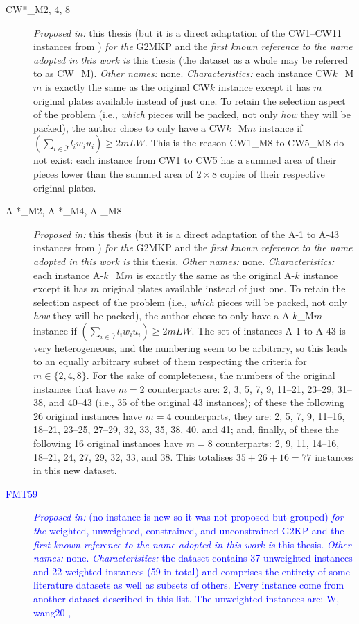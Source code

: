 \documentclass[ppgc,tese,english,formais,babel]{iiufrgs}
\newif\iffinalversion
\newcommand{\newtext}[1]{\iffinalversion%
#1%
\else%
\textcolor{blue}{#1}%
\fi%
}
\begin{document}
\begin{description}
\item [CW*\_M{2, 4, 8}] \emph{Proposed in:} this thesis (but it is a direct adaptation of the CW1--CW11 instances from \citet{fayard:1998}) \emph{for the} G2MKP and the \emph{first known reference to the name adopted in this work is} this thesis (the dataset as a whole may be referred to as CW\_M). \emph{Other names:} none. \emph{Characteristics:} each instance CW\(k\)\_M\(m\) is exactly the same as the original CW\(k\) instance except it has \(m\) original plates available instead of just one. To retain the selection aspect of the problem (i.e., \emph{which} pieces will be packed, not only \emph{how} they will be packed), the author chose to only have a CW\(k\)\_M\(m\) instance if \((\sum_{i \in \bar{J}} l_i w_i u_i) \geq 2 m L W\). This is the reason CW1\_M8 to CW5\_M8 do not exist: each instance from CW1 to CW5 has a summed area of their pieces lower than the summed area of \(2 \times 8\) copies of their respective original plates.
\item [A-*\_M2, A-*\_M4, A-\_M8] \emph{Proposed in:} this thesis (but it is a direct adaptation of the A-1 to A-43 instances from \citet{macedo:2010}) \emph{for the} G2MKP and the \emph{first known reference to the name adopted in this work is} this thesis. \emph{Other names:} none. \emph{Characteristics:} each instance A-\(k\)\_M\(m\) is exactly the same as the original A-\(k\) instance except it has \(m\) original plates available instead of just one. To retain the selection aspect of the problem (i.e., \emph{which} pieces will be packed, not only \emph{how} they will be packed), the author chose to only have a A-\(k\)\_M\(m\) instance if \((\sum_{i \in \bar{J}} l_i w_i u_i) \geq 2 m L W\). The set of instances A-1 to A-43 is very heterogeneous, and the numbering seem to be arbitrary, so this leads to an equally arbitrary subset of them respecting the criteria for \(m \in \{2, 4, 8\}\). For the sake of completeness, the numbers of the original instances that have \(m = 2\) counterparts are: 2, 3, 5, 7, 9, 11--21, 23--29, 31--38, and 40--43 (i.e., 35 of the original 43 instances); of these the following 26 original instances have \(m = 4\) counterparts, they are: 2, 5, 7, 9, 11--16, 18--21, 23--25, 27--29, 32, 33, 35, 38, 40, and 41; and, finally, of these the following 16 original instances have \(m = 8\) counterparts: 2, 9, 11, 14--16, 18--21, 24, 27, 29, 32, 33, and 38. This totalises \(35 + 26 + 16 = 77\) instances in this new dataset.
\item [\newtext{FMT59}] \newtext{\emph{Proposed in:} \citet{furini:2016} (no instance is new so it was not proposed but grouped) \emph{for the} weighted, unweighted, constrained, and unconstrained G2KP and the \emph{first known reference to the name adopted in this work is} this thesis. \emph{Other names:} none. \emph{Characteristics:} the dataset contains 37 unweighted instances and 22 weighted instances (59 in total) and comprises the entirety of some literature datasets as well as subsets of others. Every instance come from another dataset described in this list. The unweighted instances are: W, wang20 \citep{wang:1983},
}
\end{description}
\end{document}
